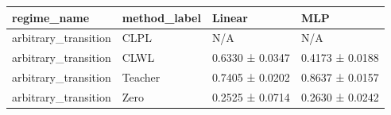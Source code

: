 \begin{tabular}{llll}
\toprule
regime_name & method_label & Linear & MLP \\
\midrule
arbitrary_transition & CLPL & N/A & N/A \\
arbitrary_transition & CLWL & 0.6330 ± 0.0347 & 0.4173 ± 0.0188 \\
arbitrary_transition & Teacher & 0.7405 ± 0.0202 & 0.8637 ± 0.0157 \\
arbitrary_transition & Zero & 0.2525 ± 0.0714 & 0.2630 ± 0.0242 \\
\bottomrule
\end{tabular}

